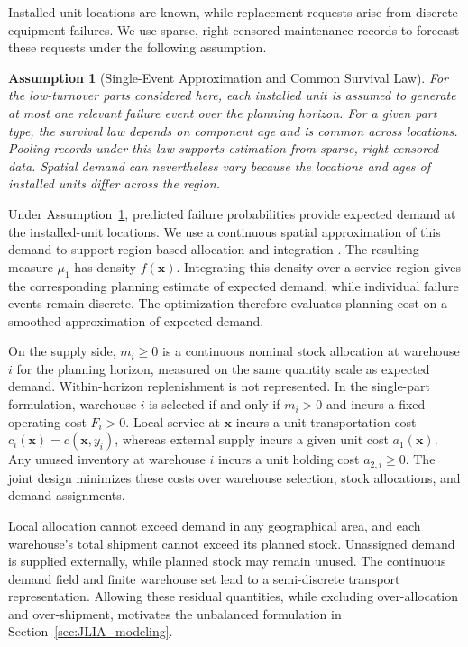 \documentclass[a4paper,fleqn]{cas-sc}
\newtheorem{assumption}{Assumption}
\theoremstyle{remark}
\theoremstyle{plain}
\begin{document}
Installed-unit locations are known, while replacement requests arise from discrete equipment failures. We use sparse, right-censored maintenance records to forecast these requests under the following assumption.

\begin{assumption}[Single-Event Approximation and Common Survival Law]
\label{ass:failure_process}
For the low-turnover parts considered here, each installed unit is assumed to generate at most one relevant failure event over the planning horizon. For a given part type, the survival law depends on component age and is common across locations. Pooling records under this law supports estimation from sparse, right-censored data. Spatial demand can nevertheless vary because the locations and ages of installed units differ across the region.
\end{assumption}

Under Assumption~\ref{ass:failure_process}, predicted failure probabilities provide expected demand at the installed-unit locations. We use a continuous spatial approximation of this demand to support region-based allocation and integration \citep{murat2010continuous,mizutani2025spare}. The resulting measure $\mu_1$ has density $f(\bm x)$. Integrating this density over a service region gives the corresponding planning estimate of expected demand, while individual failure events remain discrete. The optimization therefore evaluates planning cost on a smoothed approximation of expected demand.

On the supply side, $m_i\ge0$ is a continuous nominal stock allocation at warehouse $i$ for the planning horizon, measured on the same quantity scale as expected demand. Within-horizon replenishment is not represented. In the single-part formulation, warehouse $i$ is selected if and only if $m_i>0$ and incurs a fixed operating cost $F_i>0$. Local service at $\bm x$ incurs a unit transportation cost $c_i(\bm x)=c(\bm x,y_i)$, whereas external supply incurs a given unit cost $a_1(\bm x)$. Any unused inventory at warehouse $i$ incurs a unit holding cost $a_{2,i}\ge0$. The joint design minimizes these costs over warehouse selection, stock allocations, and demand assignments.

Local allocation cannot exceed demand in any geographical area, and each warehouse's total shipment cannot exceed its planned stock. Unassigned demand is supplied externally, while planned stock may remain unused. The continuous demand field and finite warehouse set lead to a semi-discrete transport representation. Allowing these residual quantities, while excluding over-allocation and over-shipment, motivates the unbalanced formulation in Section~\ref{sec:JLIA_modeling}.
\end{document}
